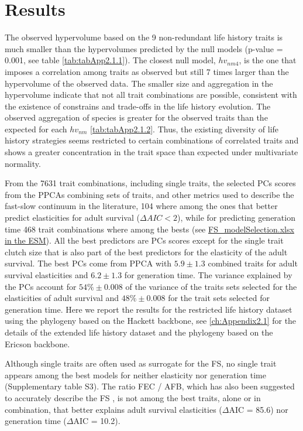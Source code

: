 \section{Results}

The observed hypervolume based on the 9 non-redundant life history traits is 
much smaller than the hypervolumes predicted by the null models (p-value = 
0.001, see table \ref{tab:tabApp2.1.1}). The closest null model, 
$hv_{nm4}$, is the one that imposes a correlation among traits as observed but 
still 7 times larger than the hypervolume of the observed data. The smaller 
size and aggregation in the hypervolume indicate that not all trait 
combinations are possible, consistent with the existence of constrains and 
trade-offs in the life history evolution. The observed aggregation of species 
is greater for the observed traits than the expected for each $hv_{nm}$
\ref{tab:tabApp2.1.2}. Thus, the existing diversity of life history strategies
seems restricted to certain combinations of correlated traits and shows a
greater concentration in the trait space than expected under multivariate
normality.

From the 7631 trait combinations, including single traits, the selected PCs 
scores from the PPCAs combining sets of traits, and other metrics used to 
describe the fast-slow continuum in the literature, 104 where among 
the ones that better predict elasticities for adult survival ($\Delta AIC < 2$),
while for predicting generation time 468 trait combinations where among the
bests (see \href{TODO}{FS\_modelSelection.xlsx in the ESM}). All the best
predictors are PCs scores except for the single trait clutch size that is also
part of the best predictors for the elasticity of the adult survival.
The best PCs come from PPCA with $5.9 \pm 1.3$ combined traits for adult 
survival elasticities and $6.2 \pm 1.3$ for generation time. The variance 
explained by the PCs account for $54\% \pm 0.008$ of the variance of the traits 
sets selected for the elasticities of adult survival and $48\% \pm 0.008$ 
for the trait sets selected for generation time. Here we report the results for 
the restricted life history dataset using the phylogeny based on the Hackett 
backbone, see \ref{ch:Appendix2.1} for the details of the extended life 
history dataset and the phylogeny based on the Ericson backbone.

Although single traits are often used as surrogate for the FS, no single 
trait appears among the best models for neither elasticity nor generation time 
(Supplementary table S3). The ratio FEC / AFB, which has also been suggested to 
accurately describe the FS \citep{Oli2004}⁠, is not among the best traits, 
alone or in combination, that better explains adult survival elasticities 
($\Delta$AIC = 85.6) nor generation time ($\Delta$AIC = 10.2). 

